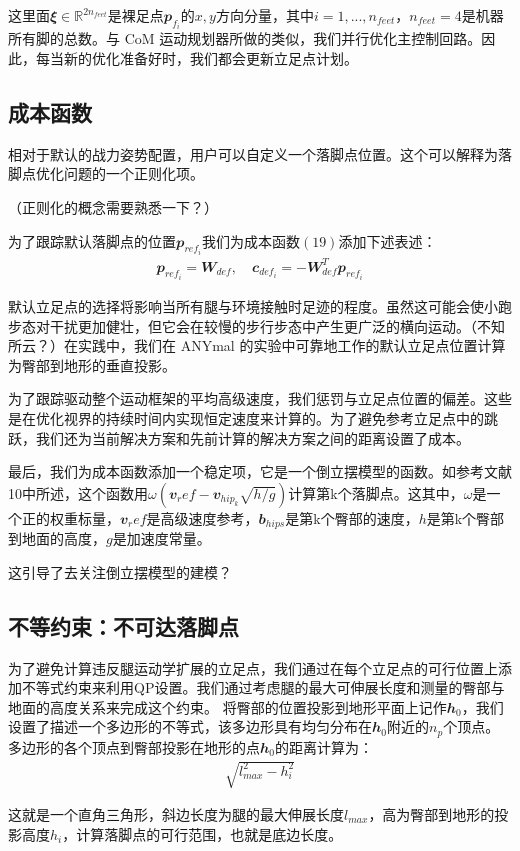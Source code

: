 这里面${\mathbfit \xi}\in {\mathbb R}^{2n_{feet}}$是裸足点${\mathbfit p}_{f_i}$的$x,y$方向分量，其中$i=1,...,n_{feet}$，$n_{feet}=4$是机器所有脚的总数。与 CoM 运动规划器所做的类似，我们并行优化主控制回路。因此，每当新的优化准备好时，我们都会更新立足点计划。
\subsection{成本函数}
相对于默认的战力姿势配置，用户可以自定义一个落脚点位置。这个可以解释为落脚点优化问题的一个正则化项。
\begin{note}
    （正则化的概念需要熟悉一下？）
\end{note}
为了跟踪默认落脚点的位置${\mathbfit p}_{ref_i}$我们为成本函数$(19)$添加下述表述：
\begin{align}
    {\mathbfit p}_{ref_i} = {\mathbfit W}_{def}, \quad {\mathbfit c}_{def_i} = - {\mathbfit W}^T_{def} {\mathbfit p}_{ref_i}
\end{align}

默认立足点的选择将影响当所有腿与环境接触时足迹的程度。虽然这可能会使小跑步态对干扰更加健壮，但它会在较慢的步行步态中产生更广泛的横向运动。（不知所云？）在实践中，我们在 ANYmal 的实验中可靠地工作的默认立足点位置计算为臀部到地形的垂直投影。

为了跟踪驱动整个运动框架的平均高级速度，我们惩罚与立足点位置的偏差。这些是在优化视界的持续时间内实现恒定速度来计算的。为了避免参考立足点中的跳跃，我们还为当前解决方案和先前计算的解决方案之间的距离设置了成本。

最后，我们为成本函数添加一个稳定项，它是一个倒立摆模型的函数。如参考文献10中所述，这个函数用$\omega ({\mathbfit v}_ref - {\mathbfit v}_{hip_k}\sqrt{h/g})$计算第k个落脚点。这其中，$\omega$是一个正的权重标量，${\mathbfit v}_ref$是高级速度参考，${\mathbfit b}_{hips}$是第k个臀部的速度，$h$是第k个臀部到地面的高度，$g$是加速度常量。
\begin{note}
    这引导了去关注倒立摆模型的建模？
\end{note}

\subsection{不等约束：不可达落脚点}
为了避免计算违反腿运动学扩展的立足点，我们通过在每个立足点的可行位置上添加不等式约束来利用QP设置。我们通过考虑腿的最大可伸展长度和测量的臀部与地面的高度关系来完成这个约束。
将臀部的位置投影到地形平面上记作${\mathbfit h}_0$，我们设置了描述一个多边形的不等式，该多边形具有均匀分布在${\mathbfit h}_0$附近的$n_p$个顶点。多边形的各个顶点到臀部投影在地形的点${\mathbfit h}_0$的距离计算为：
\begin{align}
    \sqrt{l_{max}^2 - h_i^2}
\end{align}
\begin{note}
    这就是一个直角三角形，斜边长度为腿的最大伸展长度$l_{max}$，高为臀部到地形的投影高度$h_i$，计算落脚点的可行范围，也就是底边长度。
\end{note}

